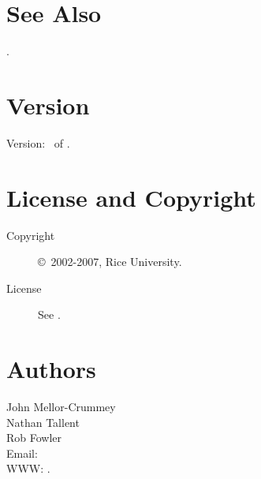 \documentclass[english]{article}
\begin{document}


\section{See Also}

.

\section{Version}

Version: \Version\ of \Date.

\section{License and Copyright}

\begin{description}
\item[Copyright] \copyright\ 2002-2007, Rice University.
\item[License] See .
\end{description}

\section{Authors}

\noindent
John Mellor-Crummey \\
Nathan Tallent \\
Rob Fowler \\
Email:  \\
WWW: .

\LatexManEnd
\end{document}
